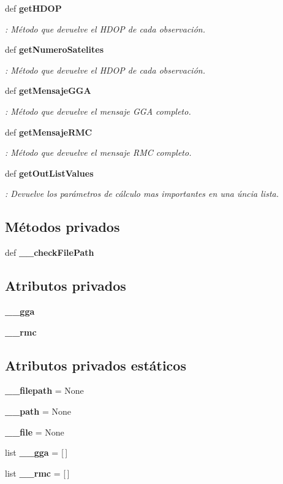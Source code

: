 \begin{DoxyCompactItemize}
def {\bf get\-H\-D\-O\-P}
\begin{DoxyCompactList}\small\item\em \-: Método que devuelve el H\-D\-O\-P de cada observación. \end{DoxyCompactList}\item 
def {\bf get\-Numero\-Satelites}
\begin{DoxyCompactList}\small\item\em \-: Método que devuelve el H\-D\-O\-P de cada observación. \end{DoxyCompactList}\item 
def {\bf get\-Mensaje\-G\-G\-A}
\begin{DoxyCompactList}\small\item\em \-: Método que devuelve el mensaje G\-G\-A completo. \end{DoxyCompactList}\item 
def {\bf get\-Mensaje\-R\-M\-C}
\begin{DoxyCompactList}\small\item\em \-: Método que devuelve el mensaje R\-M\-C completo. \end{DoxyCompactList}\item 
def {\bf get\-Out\-List\-Values}
\begin{DoxyCompactList}\small\item\em \-: Devuelve los parámetros de cálculo mas importantes en una úncia lista. \end{DoxyCompactList}\end{DoxyCompactItemize}
\subsection*{Métodos privados}
\begin{DoxyCompactItemize}
\item 
def {\bf \-\_\-\-\_\-check\-File\-Path}
\end{DoxyCompactItemize}
\subsection*{Atributos privados}
\begin{DoxyCompactItemize}
\item 
{\bf \-\_\-\-\_\-gga}
\item 
{\bf \-\_\-\-\_\-rmc}
\end{DoxyCompactItemize}
\subsection*{Atributos privados estáticos}
\begin{DoxyCompactItemize}
\item 
{\bf \-\_\-\-\_\-filepath} = None
\item 
{\bf \-\_\-\-\_\-path} = None
\item 
{\bf \-\_\-\-\_\-file} = None
\item 
list {\bf \-\_\-\-\_\-gga} = [$\,$]
\item 
list {\bf \-\_\-\-\_\-rmc} = [$\,$]
\end{DoxyCompactItemize}


